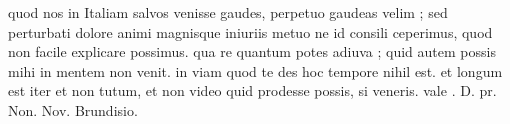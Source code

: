 


quod nos in Italiam salvos venisse gaudes, perpetuo gaudeas velim ; sed perturbati dolore animi magnisque iniuriis metuo ne id consili ceperimus, quod non facile explicare possimus. qua re quantum potes adiuva ; quid
autem possis mihi in mentem non venit. in viam quod te des hoc tempore nihil est. et longum est iter et non tutum, et non video quid prodesse possis, si veneris. vale . D. pr. Non. Nov. Brundisio.
